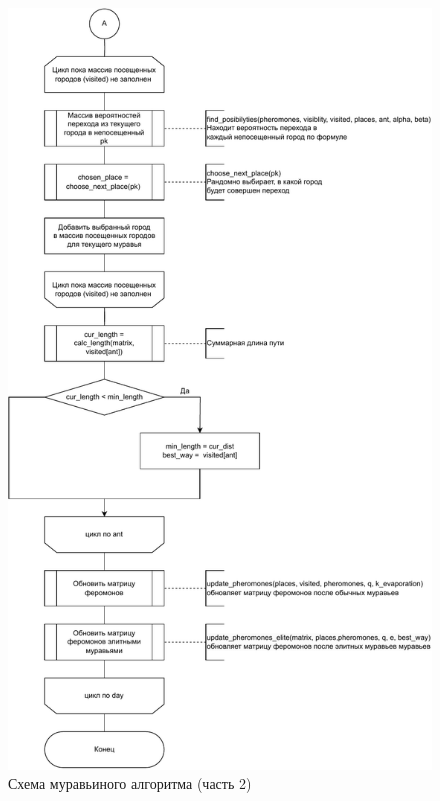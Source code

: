 \begin{figure}[h!]
	\centering
	\includegraphics[width=0.8\linewidth]{img/ant2}
	\caption{Схема муравьиного алгоритма (часть 2)}
	\label{fig:ant2}
\end{figure}
